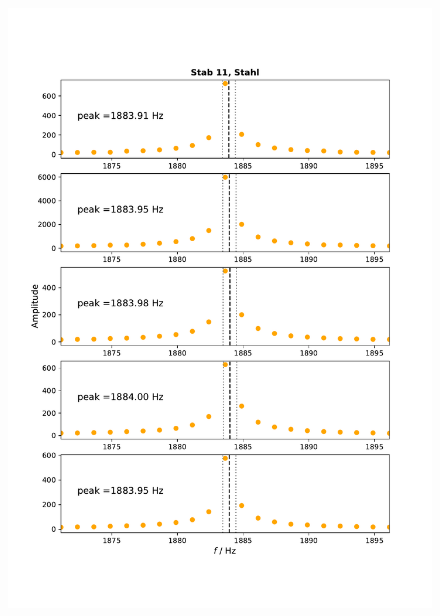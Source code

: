 \documentclass[a4paper, 12pt]{scrartcl}
\begin{document}
\begin{figure}[H]
	\centering
	\includegraphics[width=\linewidth]{plots/anhang4.pdf}
\end{figure}
\end{document}
